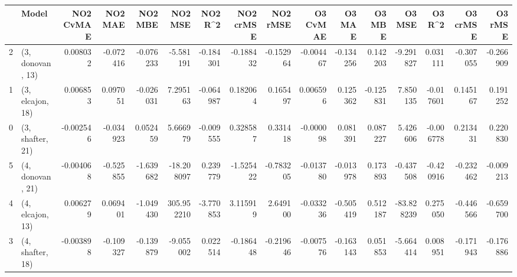 \begin{tabular}{llrrrrrrrrrrrrrr}
\toprule
{} &             Model &  NO2 CvMAE &   NO2 MAE &   NO2 MBE &     NO2 MSE &   NO2 R\textasciicircum2 &  NO2 crMSE &  NO2 rMSE &  O3 CvMAE &    O3 MAE &    O3 MBE &     O3 MSE &    O3 R\textasciicircum2 &  O3 crMSE &   O3 rMSE \\
\midrule
2 &  (3, donovan, 13) &   0.008032 & -0.072416 & -0.076233 &   -5.581191 & -0.184301 &  -0.188432 & -0.152964 & -0.004467 & -0.134256 &  0.142203 &  -9.291827 &  0.031111 & -0.307055 & -0.266909 \\
1 &  (3, elcajon, 18) &   0.006853 &  0.097051 & -0.026031 &    7.295163 & -0.064987 &   0.182064 &  0.165497 &  0.006596 &  0.125362 & -0.125831 &   7.850135 & -0.017601 &  0.145167 &  0.191252 \\
0 &  (3, shafter, 21) &  -0.002546 & -0.034923 &  0.052459 &    5.666979 & -0.009555 &   0.328587 &  0.331418 & -0.000098 &  0.081391 &  0.087227 &   5.426606 & -0.006778 &  0.213431 &  0.220830 \\
5 &  (4, donovan, 21) &  -0.004068 & -0.525855 & -1.639682 &  -18.208097 &  0.239779 &  -1.525422 & -0.783205 & -0.013780 & -0.013978 &  0.173893 &  -0.437508 & -0.420916 & -0.232462 & -0.009213 \\
4 &  (4, elcajon, 13) &   0.006279 &  0.069401 & -1.049430 &  305.952210 & -3.770853 &   3.115919 &  2.649100 & -0.033236 & -0.505419 &  0.512187 & -83.828239 &  0.275050 & -0.446566 & -0.659700 \\
3 &  (4, shafter, 18) &  -0.003898 & -0.109327 & -0.139879 &   -9.055002 &  0.022514 &  -0.186448 & -0.219646 & -0.007576 & -0.163143 &  0.051853 &  -5.664414 &  0.008951 & -0.171943 & -0.176886 \\
\bottomrule
\end{tabular}
